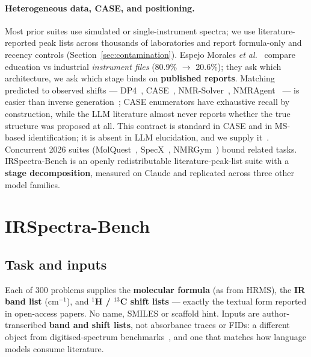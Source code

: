 \documentclass{article}
\begin{document}
\paragraph{Heterogeneous data, CASE, and positioning.}
Most prior suites use simulated or single-instrument spectra; we use literature-reported
peak lists across thousands of laboratories and report formula-only and recency controls
(Section~\ref{sec:contamination}).
Espejo Morales \textit{et al.}~\citep{espejo2026agentic} compare education vs industrial
\emph{instrument files} (80.9\% $\to$ 20.6\%); they ask which architecture, we ask which stage
binds on \textbf{published reports}.
Matching predicted to observed shifts --- DP4~\citep{smith2010dp4},
CASE~\citep{elyashberg2012case}, NMR-Solver~\citep{jin2025nmrsolver},
NMRAgent~\citep{fang2026nmragent} --- is easier than inverse generation~\citep{buevich2016synergistic}; CASE enumerators
have exhaustive recall by construction, while the LLM literature almost never reports whether
the true structure was proposed at all. This contract is standard in CASE and in MS-based identification; it is absent in LLM elucidation, and we supply it~\citep{schymanski2017casmi,elyashberg2021acdse,stravs2022msnovelist,duhrkop2015csifingerid}.  
Concurrent 2026 suites (MolQuest~\citep{han2026molquest}, SpecX~\citep{xiang2026specx},
NMRGym~\citep{fang2026nmrgym}) bound related tasks.
IRSpectra-Bench is an openly redistributable literature-peak-list suite with a \textbf{stage
decomposition}, measured on Claude and replicated across three other model families.

\FloatBarrier
\section{IRSpectra-Bench}
\label{sec:benchmark}

\subsection{Task and inputs}

Each of 300 problems supplies the \textbf{molecular formula} (as from HRMS), the \textbf{IR
band list} (cm$^{-1}$), and \textbf{$^1$H / $^{13}$C shift lists} --- exactly the textual form
reported in open-access papers.
No name, SMILES or scaffold hint.
Inputs are author-transcribed \textbf{band and shift lists}, not absorbance traces or FIDs:
a different object from digitised-spectrum benchmarks~\citep{espejo2026agentic}, and one that
matches how language models consume literature.
\end{document}
